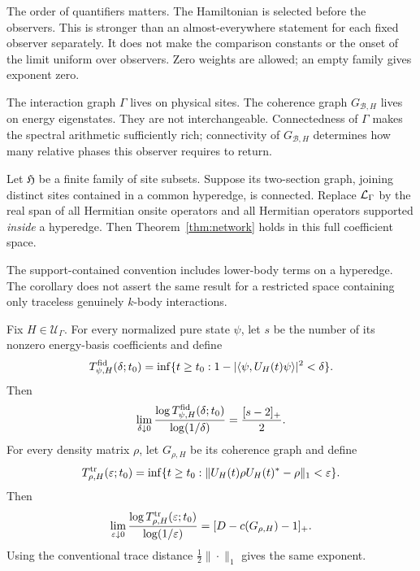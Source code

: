 The order of quantifiers matters. The Hamiltonian is selected before the
observers. This is stronger than an almost-everywhere statement for each
fixed observer separately. It does not make the comparison constants or
the onset of the limit uniform over observers. Zero weights are allowed;
an empty family gives exponent zero.

The interaction graph $\Gamma$ lives on physical sites.
The coherence graph $G_{\mathcal B,H}$ lives on energy eigenstates.
They are not interchangeable. Connectedness of $\Gamma$ makes the
spectral arithmetic sufficiently rich; connectivity of
$G_{\mathcal B,H}$ determines how many relative phases this observer
requires to return.

\begin{corollary}
\label{cor:hyper}
Let $\mathfrak H$ be a finite family of site subsets. Suppose its
two-section graph, joining distinct sites contained in a common
hyperedge, is connected. Replace $\mathcal L_\Gamma$ by the real span of all
Hermitian onsite operators and all Hermitian operators supported
\emph{inside} a hyperedge. Then Theorem~\ref{thm:network} holds in this
full coefficient space.
\end{corollary}

The support-contained convention includes lower-body terms on a
hyperedge. The corollary does not assert the same result for a restricted
space containing only traceless genuinely $k$-body interactions.

\begin{corollary}\label{cor:states}
Fix $H\in\mathcal U_\Gamma$.
For every normalized pure state $\psi$, let $s$ be the number of its
nonzero energy-basis coefficients and define
\[
 T_{\psi,H}^{\rm fid}(\delta;t_0)=
 \inf\{t\geq t_0:1-|\langle\psi,U_H(t)\psi\rangle|^2<\delta\}.
\]
Then
\begin{equation}
 \lim_{\delta\downarrow0}
 \frac{\log T_{\psi,H}^{\rm fid}(\delta;t_0)}{\log(1/\delta)}
     =\frac{[s-2]_+}{2}.                       \label{eq:pure}
\end{equation}
For every density matrix $\rho$, let $G_{\rho,H}$ be its coherence graph
and define
\[
 T_{\rho,H}^{\rm tr}(\varepsilon;t_0)=
 \inf\{t\geq t_0:\|U_H(t)\rho U_H(t)^*-\rho\|_1<\varepsilon\}.
\]
Then
\begin{equation}
 \lim_{\varepsilon\downarrow0}
 \frac{\log T_{\rho,H}^{\rm tr}(\varepsilon;t_0)}
      {\log(1/\varepsilon)}
       =[D-c(G_{\rho,H})-1]_+.                 \label{eq:trace}
\end{equation}
Using the conventional trace distance $\frac12\|\cdot\|_1$
gives the same exponent.
\end{corollary}

